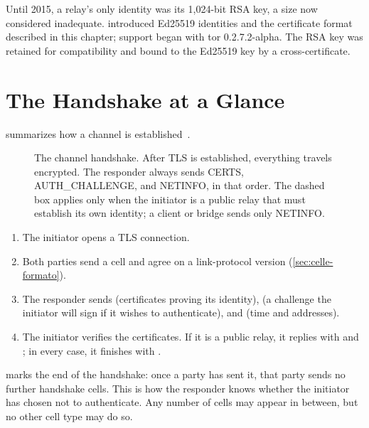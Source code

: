 \begin{storia}
Until 2015, a relay's only identity was its 1,024-bit RSA key, a size now considered inadequate.  introduced Ed25519 identities and the certificate format described in this chapter; support began with tor 0.2.7.2-alpha. The RSA key was retained for compatibility and bound to the Ed25519 key by a cross-certificate.
\end{storia}

\section{The Handshake at a Glance}\label{sec:canale-handshake}

 summarizes how a channel is established~.

\begin{figure}[htbp]
\centering

\caption{The channel handshake. After TLS is established, everything travels encrypted. The responder always sends CERTS, AUTH\_CHALLENGE, and NETINFO, in that order. The dashed box applies only when the initiator is a public relay that must establish its own identity; a client or bridge sends only NETINFO.}
\label{fig:handshake-canale}
\end{figure}

\begin{enumerate}
  \item The initiator opens a TLS connection.
  \item Both parties send a  cell and agree on a link-protocol version (\cref{sec:celle-formato}).
  \item The responder sends  (certificates proving its identity),  (a challenge the initiator will sign if it wishes to authenticate), and  (time and addresses).
  \item The initiator verifies the certificates. If it is a public relay, it replies with  and ; in every case, it finishes with .
\end{enumerate}

 marks the end of the handshake: once a party has sent it, that party sends no further handshake cells. This is how the responder knows whether the initiator has chosen not to authenticate. Any number of  cells may appear in between, but no other cell type may do so.

